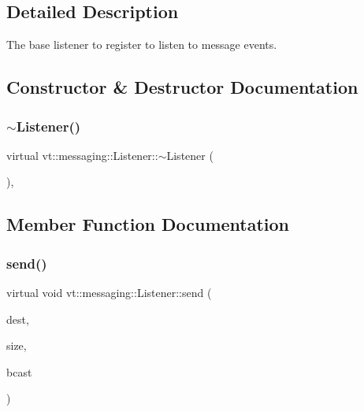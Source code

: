 \subsection{Detailed Description}
The base listener to register to listen to message events. 

\subsection{Constructor \& Destructor Documentation}
\mbox{\label{structvt_1_1messaging_1_1_listener_aee8a1131c7427cb1f8e2005605f2718c}} 
\subsubsection{\texorpdfstring{$\sim$\+Listener()}{~Listener()}}
{\footnotesize\ttfamily virtual vt\+::messaging\+::\+Listener\+::$\sim$\+Listener (\begin{DoxyParamCaption}{ }\end{DoxyParamCaption})\hspace{0.3cm}{\ttfamily [inline]}, {\ttfamily [virtual]}}



\subsection{Member Function Documentation}
\mbox{\label{structvt_1_1messaging_1_1_listener_ab2b334277feecb181a28f613c68bfc53}} 
\subsubsection{\texorpdfstring{send()}{send()}}
{\footnotesize\ttfamily virtual void vt\+::messaging\+::\+Listener\+::send (\begin{DoxyParamCaption}\item[{\hyperlink{namespacevt_a866da9d0efc19c0a1ce79e9e492f47e2}{Node\+Type}}]{dest,  }\item[{\hyperlink{namespacevt_a408e86a8c7c89309b52907dc5a513924}{Msg\+Size\+Type}}]{size,  }\item[{bool}]{bcast }\end{DoxyParamCaption})\hspace{0.3cm}{\ttfamily [pure virtual]}}



